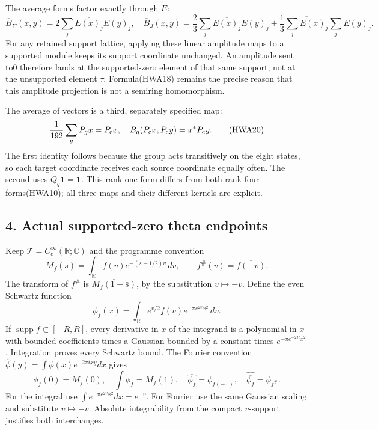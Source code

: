 \documentclass[
  10pt,
  a4paper,
]{article}
\begin{document}
The average forms factor exactly through \(E\): \[
\overline B_\Sigma(x,y)=2\sum_j\overline{E(x)_j}E(y)_j,
\quad
\overline B_J(x,y)=\frac23\sum_j\overline{E(x)_j}E(y)_j
 +\frac13\overline{\sum_jE(x)_j}\sum_jE(y)_j.
\tag{HWA19}
\] For any retained support lattice, applying these linear amplitude
maps to a supported module keeps its support coordinate unchanged. An
amplitude sent to0 therefore lands at the supported-zero element of that
same support, not at the unsupported element \(\tau\). Formula(HWA18)
remains the precise reason that this amplitude projection is not a
semiring homomorphism.

The average of vectors is a third, separately specified map: \[
\frac1{192}\sum_gP_gx=P_{\rm c}x,
\quad B_q(P_{\rm c}x,P_{\rm c}y)=x^*P_{\rm c}y.
\tag{HWA20}
\] The first identity follows because the group acts transitively on the
eight states, so each target coordinate receives each source coordinate
equally often. The second uses \(Q_q\mathbf1=\mathbf1\). This rank-one
form differs from both rank-four forms(HWA10); all three maps and their
different kernels are explicit.

\subsection{4. Actual supported-zero theta
endpoints}\label{actual-supported-zero-theta-endpoints}

Keep \(\mathcal T=C_c^\infty(\mathbb R;\mathbb C)\) and the programme
convention \[
M_f(s)=\int_{\mathbb R}f(v)e^{-(s-1/2)v}\,dv,
\qquad f^\#(v)=\overline{f(-v)}.
\tag{HWA21}
\] The transform of \(f^\#\) is \(\overline{M_f(1-\bar s)}\), by the
substitution \(v\mapsto-v\). Define the even Schwartz function \[
\phi_f(x)=\int_{\mathbb R}e^{v/2}f(v)e^{-\pi e^{2v}x^2}\,dv.
\tag{HWA22}
\] If \(\operatorname{supp}f\subset[-R,R]\), every derivative in \(x\)
of the integrand is a polynomial in \(x\) with bounded coefficients
times a Gaussian bounded by a constant times \(e^{-\pi e^{-2R}x^2}\).
Integration proves every Schwartz bound. The Fourier convention
\(\widehat\phi(y)=\int\phi(x)e^{-2\pi ixy}dx\) gives \[
\phi_f(0)=M_f(0),\quad \int\phi_f=M_f(1),
\quad\widehat{\phi_f}=\phi_{f(-\cdot)},
\quad\widehat{\overline{\phi_f}}=\phi_{f^\#}.
\tag{HWA23}
\] For the integral use \(\int e^{-\pi e^{2v}x^2}dx=e^{-v}\). For
Fourier use the same Gaussian scaling and substitute \(v\mapsto-v\).
Absolute integrability from the compact \(v\)-support justifies both
interchanges.
\end{document}

